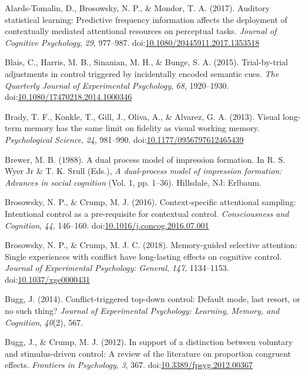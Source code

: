 \documentclass[english,,man,floatsintext]{apa6}
\begin{document}
\hypertarget{ref-alards-tomalin_auditory_2017}{}
Alards-Tomalin, D., Brosowsky, N. P., \& Mondor, T. A. (2017). Auditory
statistical learning: Predictive frequency information affects the
deployment of contextually mediated attentional resources on perceptual
tasks. \emph{Journal of Cognitive Psychology}, \emph{29}, 977--987.
doi:\href{https://doi.org/10.1080/20445911.2017.1353518}{10.1080/20445911.2017.1353518}

\hypertarget{ref-blais_trial-by-trial_2015}{}
Blais, C., Harris, M. B., Sinanian, M. H., \& Bunge, S. A. (2015).
Trial-by-trial adjustments in control triggered by incidentally encoded
semantic cues. \emph{The Quarterly Journal of Experimental Psychology},
\emph{68}, 1920--1930.
doi:\href{https://doi.org/10.1080/17470218.2014.1000346}{10.1080/17470218.2014.1000346}

\hypertarget{ref-brady_visual_2013}{}
Brady, T. F., Konkle, T., Gill, J., Oliva, A., \& Alvarez, G. A. (2013).
Visual long-term memory has the same limit on fidelity as visual working
memory. \emph{Psychological Science}, \emph{24}, 981--990.
doi:\href{https://doi.org/10.1177/0956797612465439}{10.1177/0956797612465439}

\hypertarget{ref-brewer_dual_1988}{}
Brewer, M. B. (1988). A dual process model of impression formation. In
R. S. Wyer Jr \& T. K. Srull (Eds.), \emph{A dual-process model of
impression formation: Advances in social cognition} (Vol. 1, pp. 1--36).
Hillsdale, NJ: Erlbaum.

\hypertarget{ref-brosowsky_context-specific_2016}{}
Brosowsky, N. P., \& Crump, M. J. (2016). Context-specific attentional
sampling: Intentional control as a pre-requisite for contextual control.
\emph{Consciousness and Cognition}, \emph{44}, 146--160.
doi:\href{https://doi.org/10.1016/j.concog.2016.07.001}{10.1016/j.concog.2016.07.001}

\hypertarget{ref-brosowsky_memory-guided_2018}{}
Brosowsky, N. P., \& Crump, M. J. C. (2018). Memory-guided selective
attention: Single experiences with conflict have long-lasting effects on
cognitive control. \emph{Journal of Experimental Psychology: General},
\emph{147}, 1134--1153.
doi:\href{https://doi.org/10.1037/xge0000431}{10.1037/xge0000431}

\hypertarget{ref-bugg_conflict-triggered_2014}{}
Bugg, J. (2014). Conflict-triggered top-down control: Default mode, last
resort, or no such thing? \emph{Journal of Experimental Psychology:
Learning, Memory, and Cognition}, \emph{40}(2), 567.

\hypertarget{ref-bugg_support_2012}{}
Bugg, J., \& Crump, M. J. (2012). In support of a distinction between
voluntary and stimulus-driven control: A review of the literature on
proportion congruent effects. \emph{Frontiers in Psychology}, \emph{3},
367.
doi:\href{https://doi.org/10.3389/fpsyg.2012.00367}{10.3389/fpsyg.2012.00367}
\end{document}

